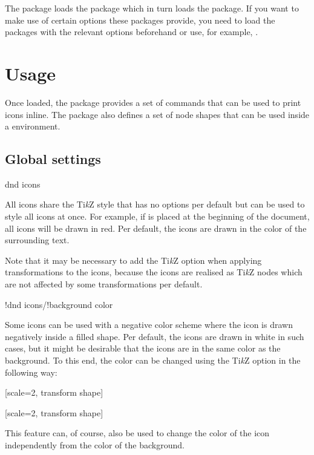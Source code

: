 \documentclass[a4paper]{article}
\begin{document}
The package loads the  package which in turn loads the  package. If you want to make use of certain options these packages provide, you need to load the packages with the relevant options beforehand or use, for example, .

\section{Usage}

Once loaded, the package provides a set of commands that can be used to print icons inline. The package also defines a set of node shapes that can be used inside a  environment. 

\subsection{Global settings}

\begin{macrodef}dnd icons\end{macrodef}
All icons share the Ti\emph{k}Z style  that has no options per default but can be used to style all icons at once. For example, if  is placed at the beginning of the document, all icons will be drawn in red. Per default, the icons are drawn in the color of the surrounding text. 

Note that it may be necessary to add the Ti\emph{k}Z option  when applying transformations to the icons, because the icons are realised as Ti\emph{k}Z nodes which are not affected by some transformations per default.

\begin{macrodef}!dnd icons/!background color\end{macrodef}
Some icons can be used with a negative color scheme where the icon is drawn negatively inside a filled shape. Per default, the icons are drawn in white in such cases, but it might be desirable that the icons are in the same color as the background. To this end, the color can be changed using the Ti\emph{k}Z option  in the following way:

\begin{codeexample}
\colorbox{blue!50}{%
        [scale=2, transform shape]%
}

\colorbox{blue!50}{%
        [scale=2, transform shape]%
}
\end{codeexample}
This feature can, of course, also be used to change the color of the icon independently from the color of the background.
\end{document}
